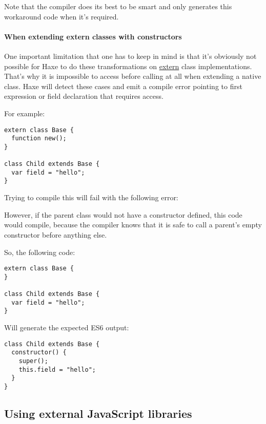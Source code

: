 Note that the compiler does its best to be smart and only generates this workaround code when it's required.

\paragraph{When extending extern classes with constructors}

One important limitation that one has to keep in mind is that it's obviously not possible for Haxe to do these transformations on \href{https://haxe.org/manual/lf-externs.html}{extern} class implementations. That's why it is impossible to access  before calling  at all when extending a native  class. Haxe will detect these cases and emit a compile error pointing to first expression or field declaration that requires  access.

For example:

\begin{lstlisting}
extern class Base {
  function new();
}

class Child extends Base {
  var field = "hello";
}
\end{lstlisting}

Trying to compile this will fail with the following error: 

However, if the parent  class would not have a constructor defined, this code would compile, because the compiler knows that it is safe to call a parent's empty  constructor before anything else.

So, the following code:

\begin{lstlisting}
extern class Base {
}

class Child extends Base {
  var field = "hello";
}
\end{lstlisting}

Will generate the expected ES6 output:

\begin{lstlisting}
class Child extends Base {
  constructor() {
    super();
    this.field = "hello";
  }
}
\end{lstlisting}

\subsection{Using external JavaScript libraries}
\label{target-javascript-external-libraries}

